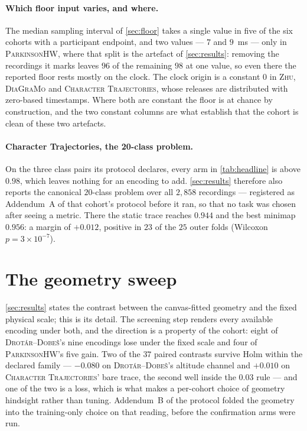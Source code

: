 \documentclass{article}
\begin{document}
\paragraph{Which floor input varies, and where.} The median sampling interval of
\cref{sec:floor} takes a single value in five of the six cohorts with a participant endpoint, and
two values --- $7$ and $9$~ms --- only in \textsc{ParkinsonHW}, where that split is the artefact of
\cref{sec:results}: removing the recordings it marks leaves $96$ of the remaining $98$ at one value,
so even there the reported floor rests mostly on the clock. The clock origin is a constant $0$ in
\textsc{Zhu}, \textsc{DiaGraMo} and \textsc{Character Trajectories}, whose releases are distributed
with zero-based timestamps. Where both are constant the floor is at chance by construction, and the
two constant columns are what establish that the cohort is clean of these two artefacts.

\paragraph{Character Trajectories, the 20-class problem.} On the three class pairs its protocol
declares, every arm in \cref{tab:headline} is above $0.98$, which leaves nothing for an encoding to
add. \cref{sec:results} therefore also reports the canonical $20$-class problem over all $2{,}858$
recordings --- registered as Addendum~A of that cohort's protocol before it ran, so that no task was
chosen after seeing a metric. There the static trace reaches $0.944$ and the best minimap $0.956$: a
margin of $+0.012$, positive in $23$ of the $25$ outer folds (Wilcoxon $p = 3 \times 10^{-7}$).

\section{The geometry sweep}
\label{sec:geometry-appendix}

\cref{sec:results} states the contrast between the canvas-fitted geometry and the fixed physical
scale; this is its detail. The screening step renders every available encoding under both, and the
direction is a property of the cohort: eight of \textsc{Drot\'ar--Dobe\v{s}}'s nine encodings lose
under the fixed scale and four of \textsc{ParkinsonHW}'s five gain. Two of the $37$ paired
contrasts survive Holm within the declared family --- $-0.080$ on \textsc{Drot\'ar--Dobe\v{s}}'s
altitude channel and $+0.010$ on \textsc{Character Trajectories}' bare trace, the second well
inside the $0.03$ rule --- and one of the two is a loss, which is what makes a per-cohort choice of
geometry hindsight rather than tuning. Addendum~B of the protocol folded the geometry into the
training-only choice on that reading, before the confirmation arms were run.
\end{document}
